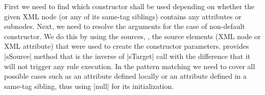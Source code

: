 First we need to find which constructor shall be used depending on whether the given XML node (or any of its same-tag siblings) contains any attributes or subnodes.
Next, we need to resolve the arguments for the case of non-default constructor.
We do this by using the sources, \Ie, the source elements (XML node or XML attribute) that were used to create the constructor parameters.
\SIGMA provides \Scala|sSource| method that is the inverse of \Scala|sTarget| call with the difference that it will not trigger any rule execution.
In the pattern matching we need to cover all possible cases such as an attribute defined locally or an attribute defined in a same-tag sibling, thus using \Scala|null| for its initialization.






